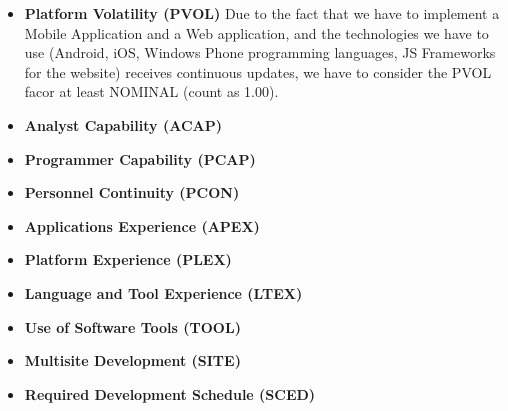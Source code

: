 \documentclass[../../../../projectPlan.tex]{subfiles}
\begin{document}
\begin{itemize}
				\item \textbf{Platform Volatility (PVOL)}
				      Due to the fact that we have to implement a Mobile Application and a Web application, and the technologies we have to use (Android, iOS, Windows Phone programming languages, JS Frameworks for the website) receives continuous updates, we have to consider the PVOL facor at least NOMINAL (count as 1.00).
				
				\item \textbf{Analyst Capability (ACAP)}
				
				\item \textbf{Programmer Capability (PCAP)}
				
				\item \textbf{Personnel Continuity (PCON)}
				
				\item \textbf{Applications Experience (APEX)}
				
				\item \textbf{Platform Experience (PLEX)}
				
				\item \textbf{Language and Tool Experience (LTEX)}
				
				\item \textbf{Use of Software Tools (TOOL)}
				
				\item \textbf{Multisite Development (SITE)}
				
				\item \textbf{Required Development Schedule (SCED)}

			\end{itemize}
\end{document}
